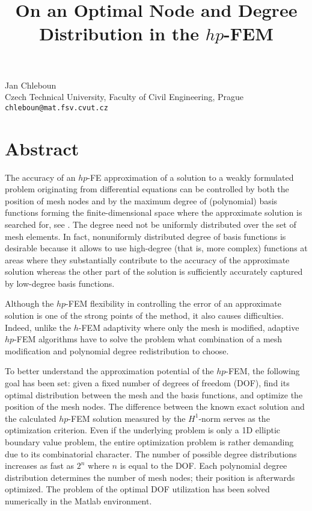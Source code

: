 \title{On an Optimal Node and Degree Distribution in the $hp$-FEM}
 \author{} \institute{}
\maketitle
\begin{center}
{\large Jan Chleboun}\\
Czech Technical University, Faculty of Civil Engineering, Prague\\
{\tt chleboun@mat.fsv.cvut.cz}

\end{center}

\section*{Abstract}

The accuracy of an $hp$-FE approximation of a solution
to a weakly formulated problem originating from differential equations
can be controlled by both the position of mesh nodes and
by the maximum degree of (polynomial) basis functions forming the 
finite-dimensional space where the approximate solution
is searched for, see \cite{BG,Sch,SSD,DKP}. The degree need not be uniformly distributed
over the set of mesh elements. In fact, nonuniformly distributed
degree of basis functions is desirable because it allows 
to use high-degree (that is, more complex) functions at areas
where they substantially contribute to the accuracy of 
the approximate solution whereas the other part of the
solution is sufficiently accurately captured by low-degree basis functions.
 
Although the $hp$-FEM flexibility in controlling the error
of an approximate solution is one of the strong points of the method,
it also causes difficulties. Indeed, unlike the $h$-FEM adaptivity
where only the mesh is modified, adaptive $hp$-FEM algorithms have
to solve the problem what combination of a mesh modification and polynomial
degree redistribution to choose. 

To better understand the approximation potential of the $hp$-FEM,
the following goal has been set: given a fixed number of degrees
of freedom (DOF), find its optimal distribution between the mesh
and the basis functions, and optimize the position of the mesh nodes. 
The difference between the known exact solution and the calculated 
$hp$-FEM solution
measured by the $H^1$-norm serves as the optimization criterion.
Even if the underlying problem is only a 1D elliptic boundary
value problem, the entire optimization problem is rather demanding
due to its combinatorial character. The number of possible degree
distributions increases as fast as $2^n$ where $n$ is equal to
the DOF. Each polynomial degree distribution determines the number
of mesh nodes; their position is afterwards optimized.
The problem of the optimal DOF utilization has been solved numerically
in the Matlab environment.




